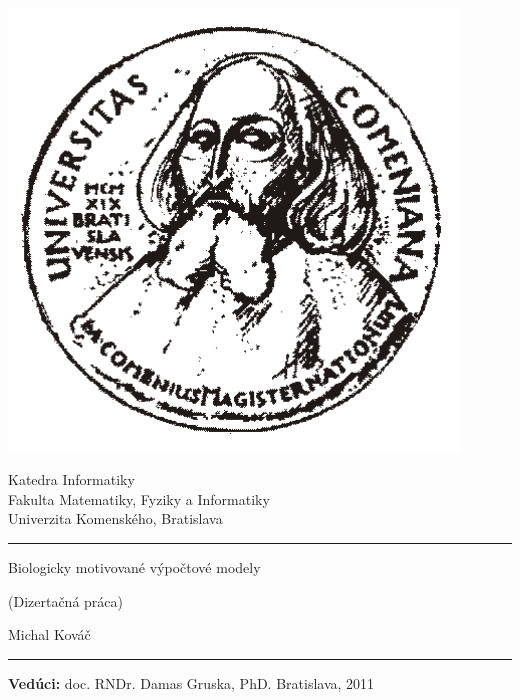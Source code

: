 \documentclass[12pt,oneside,openany,pagenumber=footcenter]{book}
\def\mftitlea{Biologicky motivované výpočtové modely}
\def\mfthesistype{Dizertačná práca}
\def\mfauthor{Michal Kováč}
\def\mfadvisor{doc. RNDr. Damas Gruska, PhD.}
\def\mfplacedate{Bratislava, 2011}
\begin{document}
\frontmatter
\thispagestyle{empty}
\begin{minipage}{0.20\textwidth}
\includegraphics[width=0.9\textwidth]{img/comenius_half.png}
\end{minipage}
\begin{minipage}{0.79\textwidth}
\begin{center}
\sc Katedra Informatiky \\
Fakulta Matematiky, Fyziky a Informatiky \\
Univerzita Komenského, Bratislava
\end{center}
\end{minipage}

\vfill
\begin{center}
\begin{minipage}{0.8\textwidth}
\hrule
\bigskip\bigskip
\centerline{\LARGE\sc\mftitlea}
\smallskip
\centerline{(\mfthesistype)}
\bigskip
\bigskip
\centerline{\large\sc\mfauthor}
\bigskip\bigskip
\hrule
\end{minipage}
\end{center}
\vfill
{\bf Vedúci:} \mfadvisor
\hfill\mfplacedate
\eject
\eject

\thispagestyle{empty}
{~}\vspace{12cm}




\tableofcontents{}
\listoffigures{}
\listoftables{}

\mainmatter

\end{document}
